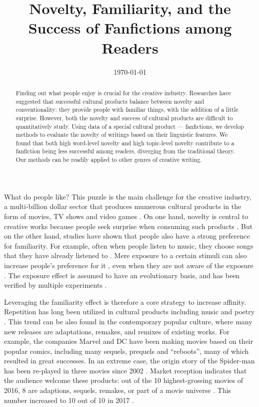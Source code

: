\documentclass[a4paper]{article}
\begin{document}

\title{Novelty, Familiarity, and the Success of Fanfictions among Readers} %
\date{\today}
\maketitle %

\begin{abstract}
Finding out what people enjoy is crucial for the creative industry. Researches have suggested that successful cultural products balance between novelty and conventionality: they provide people with familiar things, with the addition of a little surprise. However, both the novelty and success of cultural products are difficult to quantitatively study. Using data of a special cultural product --- fanfictions, we develop methods to evaluate the novelty of writings based on their linguistic features. We found that both high word-level novelty and high topic-level novelty contribute to a fanfiction being less successful among readers, diverging from the traditional theory. Our methods can be readily applied to other genres of creative writing.
\end{abstract}

What do people like? This puzzle is the main challenge for the creative industry, a multi-billion dollar sector that produces mumerous cultural products in the form of movies, TV shows and video games \cite{creativeindustries}. On one hand, novelty is central to creative works because people seek surprise when consuming such products \cite{hutter2011infinite}. But on the other hand, studies have shown that people also have a strong preference for familiarity. For example, often when people listen to music, they choose songs that they have already listened to \cite{thompson2014shazam}. Mere exposure to a certain stimuli can also increase people's preference for it \cite{zajonc1968attitudinal}, even when they are not aware of the exposure \cite{kunst1980affective}. The exposure effect is assumed to have an evolutionary basis, and has been verified by multiple experiments \cite{bornstein1989exposure}.

Leveraging the familiarity effect is therefore a core strategy to increase affinity. Repetition has long been utilized in cultural products including music and poetry \cite{huron2013psychological}. This trend can be also found in the contemporary popular culture, where many new releases are adaptations, remakes, and remixes \cite{manovich2007comes} of existing works. For example, the companies Marvel and DC have been making movies based on their popular comics, including many sequels, prequels and ``reboots'', many of which resulted in great successes. In an extreme case, the origin story of the Spider-man has been re-played in three movies since 2002 \cite{spiderman}. Market reception indicates that the audience welcome these products: out of the 10 highest-grossing movies of 2016, 8 are adaptions, sequels, remakes, or part of a movie universe \cite{2016film}. This number increased to 10 out of 10 in 2017 \cite{2017film}. 
\end{document}
